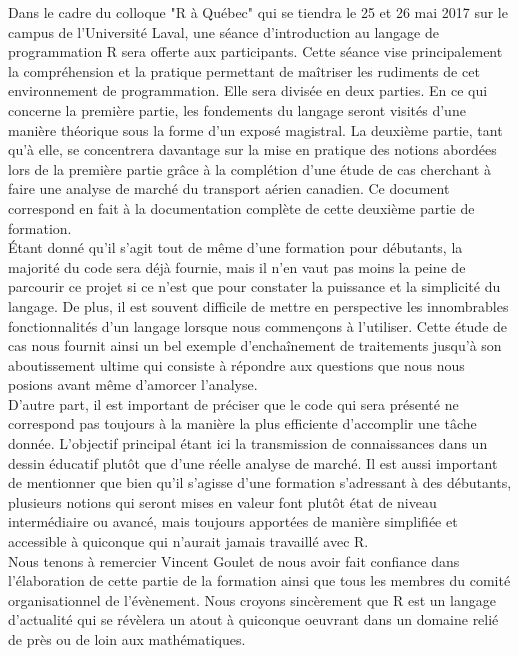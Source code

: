 Dans le cadre du colloque "R à Québec" qui se tiendra le 25 et 26 mai 2017 sur le campus de l'Université Laval, une séance d'introduction au langage de programmation R sera offerte aux participants. Cette séance vise principalement la compréhension et la pratique permettant de maîtriser les rudiments de cet environnement de programmation. \cite{RQC2017} Elle sera divisée en deux parties. En ce qui concerne la première partie, les fondements du langage seront visités d'une manière théorique sous la forme d'un exposé magistral. La deuxième partie, tant qu'à elle, se concentrera davantage sur la mise en pratique des notions abordées lors de la première partie grâce à la complétion d'une étude de cas cherchant à faire une analyse de marché du transport aérien canadien. Ce document correspond en fait à la documentation complète de cette deuxième partie de formation. \\

Étant donné qu'il s'agit tout de même d'une formation pour débutants, la majorité du code sera déjà fournie, mais il n'en vaut pas moins la peine de parcourir ce projet si ce n'est que pour constater la puissance et la simplicité du langage. De plus, il est souvent difficile de mettre en perspective les innombrables fonctionnalités d'un langage lorsque nous commençons à l'utiliser. Cette étude de cas nous fournit ainsi un bel exemple d'enchaînement de traitements jusqu'à son aboutissement ultime qui consiste à répondre aux questions que nous nous posions avant même d'amorcer l'analyse. \\

D'autre part, il est important de préciser que le code qui sera présenté ne correspond pas toujours à la manière la plus efficiente d'accomplir une tâche donnée. L'objectif principal étant ici la transmission de connaissances dans un dessin éducatif plutôt que d'une réelle analyse de marché. Il est aussi important de mentionner que bien qu'il s'agisse d'une formation s'adressant à des débutants, plusieurs notions qui seront mises en valeur font plutôt état de niveau intermédiaire ou avancé, mais toujours apportées de manière simplifiée et accessible à quiconque qui n'aurait jamais travaillé avec R. \\

Nous tenons à remercier Vincent Goulet de nous avoir fait confiance dans l'élaboration de cette partie de la formation ainsi que tous les membres du comité organisationnel de l'évènement. Nous croyons sincèrement que R est un langage d'actualité qui se révèlera un atout à quiconque oeuvrant dans un domaine relié de près ou de loin aux mathématiques.